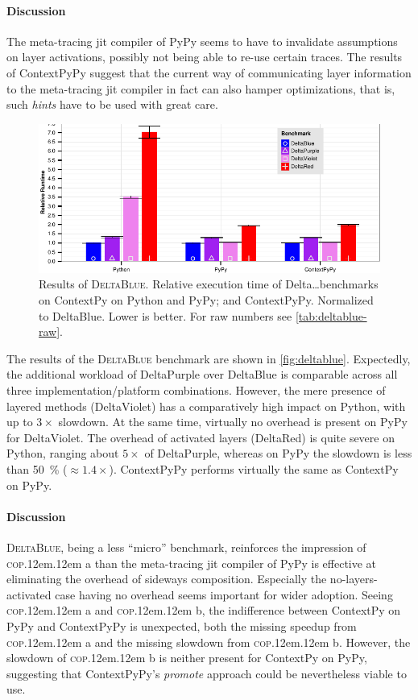 \documentclass[preprint,english,10pt,nonatbib]{sigplanconf}
\DeclareRobustCommand*\copa{\textsc{cop}\kern .12em\oldstylenums{09}\kern .12em a\xspace}
\DeclareRobustCommand*\copb{\textsc{cop}\kern .12em\oldstylenums{09}\kern .12em b\xspace}
\DeclareRobustCommand*\deltablue{\textsc{DeltaBlue}\xspace}
\begin{document}
\paragraph{Discussion} The meta-tracing \ac{jit} compiler of PyPy seems to have
to invalidate assumptions on layer activations, possibly not being able to
re-use certain traces. The results of ContextPyPy suggest that the current way
of communicating layer information to the meta-tracing \ac{jit} compiler in
fact can also hamper optimizations, that is, such \emph{hints} have to
be used with great care.

\begin{figure}
  \centering
  \includegraphics[width=.55\linewidth]{bench/DeltaBlue-norm.pdf}
  \caption{Results of \deltablue. Relative execution time of Delta\ldots benchmarks
    on ContextPy on Python and PyPy; and ContextPyPy. Normalized to DeltaBlue.
    Lower is better. For raw numbers see \autoref{tab:deltablue-raw}.}
  \label{fig:deltablue}
\end{figure}

\medskip\noindent %
The results of the \deltablue benchmark are shown in \autoref{fig:deltablue}.
Expectedly, the additional workload of DeltaPurple over DeltaBlue is comparable
across all three implementation/platform combinations. However, the mere
presence of layered methods (DeltaViolet) has a comparatively high impact on
Python, with up to \(3\times\)
slowdown. At the same time, virtually no overhead is present on PyPy for
DeltaViolet. The overhead of activated layers (DeltaRed) is quite severe on
Python, ranging about \(5\times\)
of DeltaPurple, whereas on PyPy the slowdown is less than \SI{50}{\percent}
(\(\approx 1.4\times\)). ContextPyPy performs virtually the same as ContextPy
on PyPy.

\paragraph{Discussion} \deltablue, being a less ``micro'' benchmark, reinforces
the impression of \copa than the meta-tracing \ac{jit} compiler of PyPy is
effective at eliminating the overhead of sideways composition. Especially the
no-layers-activated case having no overhead seems important for wider adoption.
Seeing \copa and \copb, the indifference between ContextPy on PyPy and
ContextPyPy is unexpected, both the missing speedup from \copa and the missing
slowdown from \copb. However, the slowdown of \copb is neither present for
ContextPy on PyPy, suggesting that ContextPyPy's \emph{promote} approach could
be nevertheless viable to use.
\end{document}
